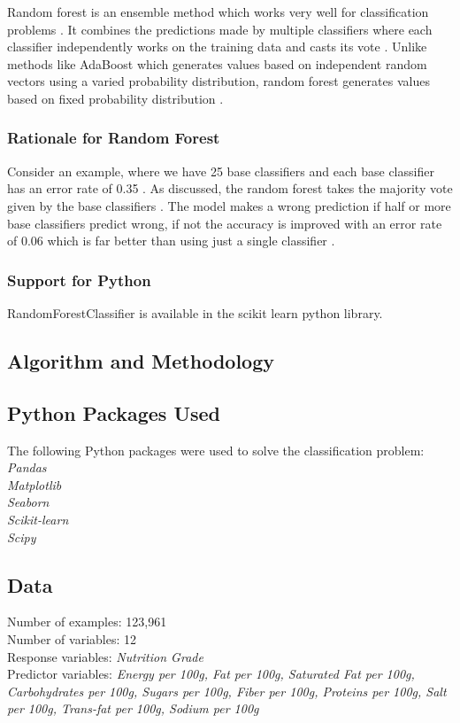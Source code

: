 \documentclass[sigconf]{acmart}
\begin{document}
Random forest is an ensemble method which works very well for classification problems \cite{book-tan}. It combines the predictions made by multiple classifiers where each classifier independently works on the training data and casts its vote \cite{book-tan}. Unlike methods like AdaBoost which generates values based on independent random vectors using a varied probability distribution, random forest generates values based on fixed probability distribution \cite{book-tan}. 

\subsubsection{Rationale for Random Forest}
Consider an example, where we have 25 base classifiers and each base classifier has an error rate of 0.35 \cite{book-tan}. As discussed, the random forest takes the majority vote given by the base classifiers \cite{book-tan}. The model makes a wrong prediction if half or more base classifiers predict wrong, if not the accuracy is improved with an error rate of 0.06 which is far better than using just a single classifier \cite{book-tan}.

\subsubsection{Support for Python} RandomForestClassifier is available in the scikit learn python library.

\subsection {Algorithm and Methodology}

\subsection{Python Packages Used}
The following Python packages were used to solve the classification problem: \\
{\em Pandas} \\
{\em Matplotlib} \\
{\em Seaborn} \\
{\em Scikit-learn} \\
{\em Scipy} \\

\subsection{Data}
Number of examples: 123,961 \\
Number of variables: 12 \\
Response variables: {\em Nutrition Grade} \\
Predictor variables: {\em Energy per 100g, Fat per 100g, Saturated Fat per 100g, Carbohydrates per 100g, Sugars per 100g, Fiber per 100g, Proteins per 100g, Salt per 100g, Trans-fat per 100g, Sodium per 100g}
\end{document}
